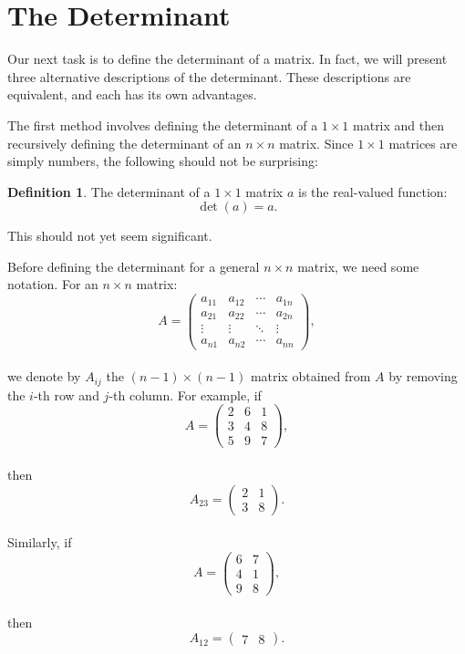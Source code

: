 \documentclass[
]{book}
\theoremstyle{definition}
\newtheorem{definition}{Definition}[chapter]
\theoremstyle{definition}
\theoremstyle{definition}
\theoremstyle{definition}
\theoremstyle{remark}
\begin{document}
\hypertarget{the-determinant}{%
\section{The Determinant}\label{the-determinant}}

Our next task is to define the determinant of a matrix. In fact, we will present three alternative descriptions of the determinant. These descriptions are equivalent, and each has its own advantages.

The first method involves defining the determinant of a \(1 \times 1\) matrix and then recursively defining the determinant of an \(n \times n\) matrix. Since \(1 \times 1\) matrices are simply numbers, the following should not be surprising:

\begin{definition}
The determinant of a \(1 \times 1\) matrix \(a\) is the real-valued function:\\
\[ \det(a) = a. \]
\end{definition}

This should not yet seem significant.

Before defining the determinant for a general \(n \times n\) matrix, we need some notation. For an \(n \times n\) matrix:\\
\[ A = 
\begin{pmatrix} 
a_{11} & a_{12} & \cdots & a_{1n} \\ 
a_{21} & a_{22} & \cdots & a_{2n} \\ 
\vdots & \vdots & \ddots & \vdots \\ 
a_{n1} & a_{n2} & \cdots & a_{nn} 
\end{pmatrix}, 
\]\\
we denote by \(A_{ij}\) the \((n - 1) \times (n - 1)\) matrix obtained from \(A\) by removing the \(i\)-th row and \(j\)-th column. For example, if\\
\[ A = 
\begin{pmatrix} 
2 & 6 & 1 \\ 
3 & 4 & 8 \\ 
5 & 9 & 7 
\end{pmatrix}, 
\]\\
then\\
\[ A_{23} = 
\begin{pmatrix} 
2 & 1 \\ 
3 & 8 
\end{pmatrix}.
\]\\
Similarly, if\\
\[ A = 
\begin{pmatrix} 
6 & 7 \\ 
4 & 1 \\ 
9 & 8 
\end{pmatrix}, 
\]\\
then\\
\[ A_{12} = 
\begin{pmatrix} 
7 & 8 
\end{pmatrix}.
\]
\end{document}
